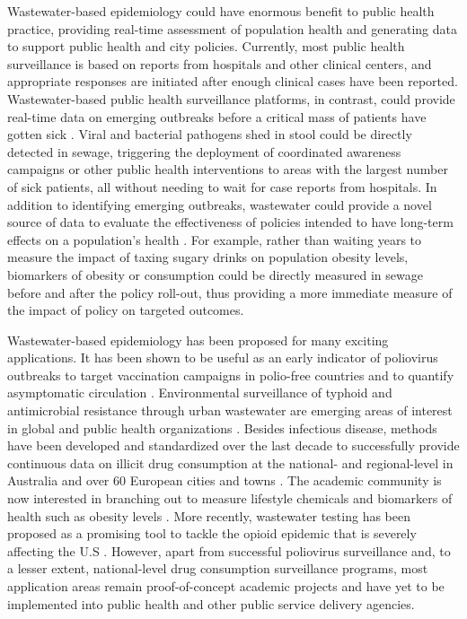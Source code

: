 Wastewater-based epidemiology could have enormous benefit to public health practice, providing real-time assessment of population health and generating data to support public health and city policies. Currently, most public health surveillance is based on reports from hospitals and other clinical centers, and appropriate responses are initiated after enough clinical cases have been reported. Wastewater-based public health surveillance platforms, in contrast, could provide real-time data on emerging outbreaks before a critical mass of patients have gotten sick \cite{Manor2014,Hellmer2014}. Viral and bacterial pathogens shed in stool could be directly detected in sewage, triggering the deployment of coordinated awareness campaigns or other public health interventions to areas with the largest number of sick patients, all without needing to wait for case reports from hospitals. In addition to identifying emerging outbreaks, wastewater could provide a novel source of data to evaluate the effectiveness of policies intended to have long-term effects on a population's health \cite{Daughton2018}. For example, rather than waiting years to measure the impact of taxing sugary drinks on population obesity levels, biomarkers of obesity or consumption could be directly measured in sewage before and after the policy roll-out, thus providing a more immediate measure of the impact of policy on targeted outcomes.

Wastewater-based epidemiology has been proposed for many exciting applications. It has been shown to be useful as an early indicator of poliovirus outbreaks to target vaccination campaigns in polio-free countries \cite{Manor2014,Kaliner2015} and to quantify asymptomatic circulation \cite{Berchenko2017}. Environmental surveillance of typhoid and antimicrobial resistance through urban wastewater are emerging areas of interest in global and public health organizations \cite{Pehrsson2017, Initiatives2018}. Besides infectious disease, methods have been developed and standardized over the last decade to successfully provide continuous data on illicit drug consumption at the national- and regional-level in Australia \cite{AustralianReport} and over 60 European cities and towns \cite{vanNuijs2018,Thomas2012,BazLomba2016}. The academic community is now interested in branching out to measure lifestyle chemicals and biomarkers of health such as obesity levels \cite{Daughton2018,Arnaud2018,Newton2015}. More recently, wastewater testing has been proposed as a promising tool to tackle the opioid epidemic that is severely affecting the U.S \cite{Keshaviah2016,Keshaviah2017}. However, apart from successful poliovirus surveillance and, to a lesser extent, national-level drug consumption surveillance programs, most application areas remain proof-of-concept academic projects and have yet to be implemented into public health and other public service delivery agencies.

